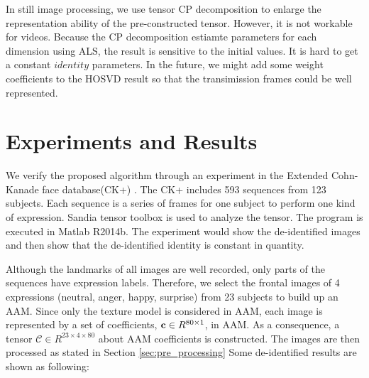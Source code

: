 	In still image processing, we use tensor CP decomposition to enlarge the
	representation ability of the pre-constructed tensor. However, it is not
	workable for videos. Because the CP decomposition estiamte parameters for
	each dimension using ALS, the result is sensitive to the initial values.
	It is hard to get a constant $identity$ parameters. 
	In the future, we might add some weight coefficients to the HOSVD result
	so that the transimission frames could be well represented. 


%
\section{Experiments and Results}
We verify the proposed algorithm through an experiment in the Extended Cohn-Kanade face database(CK+) \cite{CK10}. The
CK+ includes 593 sequences from 123 subjects. Each sequence is a series of frames for one subject to perform one kind
of expression. 
Sandia tensor toolbox \cite{TTB15} is used to analyze the tensor. The program is executed in 
Matlab R2014b. The experiment would show the de-identified images and then show that the de-identified
identity is constant in quantity.


Although the landmarks of all images are well recorded, only parts of the sequences have expression labels.
Therefore, we select the frontal images of 4 expressions (neutral, anger, happy, surprise) from 23 subjects to build up an AAM.
Since only the texture model is considered in AAM, each image is represented by a set of coefficients, 
${\bf c} \in R^{80 \times 1}$, in AAM. As a consequence, a tensor
$\mathcal{C} \in R^{23\times4\times80}$ about AAM coefficients is constructed. The images are then processed as stated in Section 
\ref{sec:pre_processing} Some de-identified results are shown as following:

